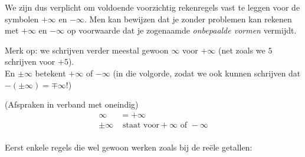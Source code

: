 \documentclass{ximera}
\begin{document}
We zijn dus verplicht om voldoende voorzichtig rekenregels vast te leggen voor de symbolen $+\infty$ en $-\infty$. Men kan bewijzen dat je zonder problemen kan rekenen met $+\infty$ en $-\infty$  op voorwaarde dat je zogenaamde \textit{onbepaalde vormen} vermijdt.

Merk op: we schrijven verder meestal gewoon $\infty$ voor $+\infty$ (net zoals we $5$ schrijven voor $+5$). \\
En $\pm\infty$ betekent $+\infty$ of $-\infty$ (in die volgorde, zodat we ook kunnen schrijven dat $-(\pm\infty) = \mp\infty$!)

\begin{notation} (Afspraken in verband met oneindig)	
	\begin{align*}
	\infty & = +\infty   \\
	\pm\infty &\text{ staat voor} +\infty \text{ of } -\infty \\
	\end{align*}
\end{notation}


Eerst enkele regels die wel gewoon werken zoals bij de reële getallen:
\end{document}
